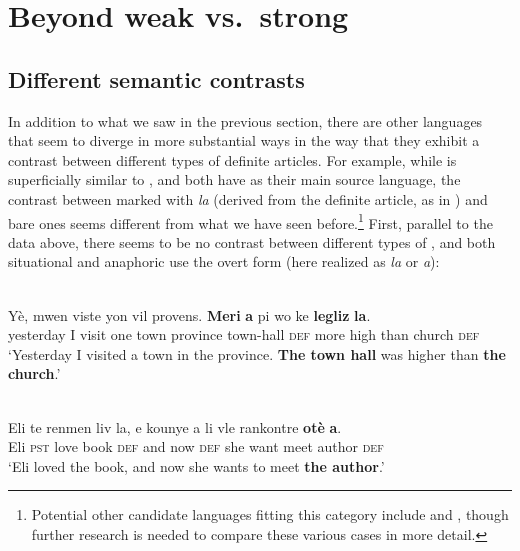 \documentclass[output=paper
,modfonts
,nonflat]{langscibook}
\begin{document}
\section{Beyond weak vs.\ strong}

\subsection{Different semantic contrasts}

In addition to what we saw in the previous section, there are other
languages that seem to diverge in more substantial ways in the way
that they exhibit a contrast between different types of definite
articles. For example, while  is superficially similar to
, and both have  as their main source language,
the contrast between  marked with \textit{la}
(derived from the  definite article, as in ) and
bare ones seems different from what we have seen
before.\footnote{Potential other candidate languages fitting this category
  include  \citep{SimpsonBiswas2016} and  \citep{Simpson2017}, though further research is needed
  to compare these various cases in more detail.} First, parallel to
the  data above, there seems to be no contrast between different
types of , and both situational and anaphoric  use the
overt form (here realized as \textit{la} or \textit{a}):

\begin{exe}
\ex\label{ex:schwarz:24} 

\begin{xlist}
\\ 
\gll Y\`e,	mwen viste yon vil provens. \textbf{Meri}	\textbf{a}	pi
wo ke \textbf{legliz} \textbf{la}.\\
 yesterday I	visit	one	town province	{town-hall} {\textsc{def}} more high than {church} {\textsc{def}}\\
\glt`Yesterday I visited a town in the province. \textbf{The town hall} was higher than \textbf{the church}.' 

\\
\gll Eli te	renmen liv	la,	e	kounye a	li
vle	rankontre \textbf{ot\`e}	\textbf{a}.\\ 
Eli \textsc{pst}	love	book \textsc{def} and now	\textsc{def} she want meet	{author} {\textsc{def}}\\
\glt `Eli loved the book, and now she wants to meet \textbf{the
  author}.' 


\end{xlist}
\end{exe}
\end{document}

